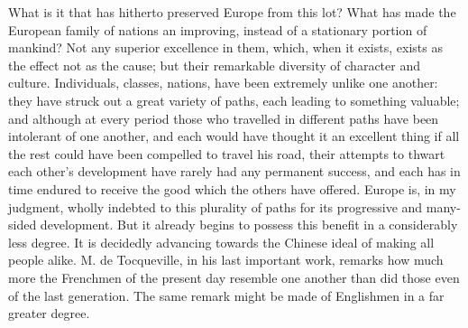 \documentclass[11pt,openany]{book}
\begin{document}
What is it that has hitherto preserved Europe from this lot? What has made the European family of nations an improving, instead of a stationary portion of mankind? Not any superior excellence in them, which, when it exists, exists as the effect not as the cause; but their remarkable diversity of character and culture. Individuals, classes, nations, have been extremely unlike one another: they have struck out a great variety of paths, each leading to something valuable; and although at every period those who travelled in different paths have been intolerant of one another, and each would have thought it an excellent thing if all the rest could have been compelled to travel his road, their attempts to thwart each other's development have rarely had any permanent success, and each has in time endured to receive the good which the others have offered. Europe is, in my judgment, wholly indebted to this plurality of paths for its progressive and many-sided development. But it already begins to possess this benefit in a considerably less degree. It is decidedly advancing towards the Chinese ideal of making all people alike. M. de Tocqueville, in his last important work, remarks how much more the Frenchmen of the present day resemble one another than did those even of the last generation. The same remark might be made of Englishmen in a far greater degree.
\end{document}
